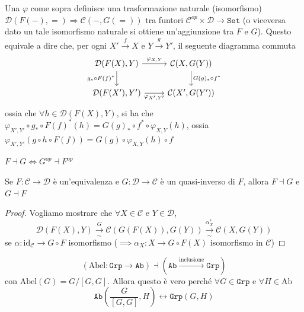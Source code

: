 \begin{remark}{}
    Una \(\varphi \) come sopra definisce una trasformazione naturale
    (isomorfismo) \(\mathcal{D}{(F{(-)}, =)} \Rightarrow \mathcal{C}{(-, G{(=)})}\) tra
    funtori \(\mathcal{C}^{op} \times \mathcal{D} \to \mathtt{Set}\) (o
    viceversa dato un tale isomorfismo naturale si ottiene un'aggiunzione tra
    \(F\) e \(G\)). Questo equivale a dire che, per ogni \( X' \overset{f}{\to }
    X\) e \(Y \overset{g}{\to } Y'\),  il seguente diagramma commuta
    \[\begin{tikzcd}
	\mathcal{D}{(F{(X)}, Y)} & \mathcal{C}{(X, G{(Y)})} \\
	\mathcal{D}{(F{(X')}, Y')} & \mathcal{C}{(X', G{(Y')})}
	\arrow["{\varphi_{X,Y}}", from=1-1, to=1-2]
	\arrow["{g_* \circ F(f)^*}"', from=1-1, to=2-1]
	\arrow["{G(g)_*\circ f^*}", from=1-2, to=2-2]
	\arrow["{\varphi_{X', Y'}}"', from=2-1, to=2-2]
\end{tikzcd}\]
    ossia che \(\forall h \in \mathcal{D}{(F{(X)}, Y)}\), si ha che
    \(\varphi_{X', Y'} \circ g_* \circ F{(f)}^{*} {(h)} = G{(g)}_* \circ f^{*}
    \circ \varphi_{X, Y} {(h)}\), ossia \(\varphi_{X',Y'} {(g \circ h \circ
    F{(f)})} = G{(g)} \circ \varphi_{X, Y} {(h)} \circ f\) 
\end{remark}

\begin{remark}{}
    \(F \dashv G \iff G^{op} \dashv F^{op}\) 
\end{remark}

\begin{example}{}
    Se \(F : \mathcal{C} \to \mathcal{D}\) è un'equivalenza e \(G : \mathcal{D}
    \to \mathcal{C}\) è un quasi-inverso di \(F\), allora \(F \dashv G \) e \(G
    \dashv F\) 
    \begin{proof}{}
        Vogliamo mostrare che \(\forall X \in \mathcal{C}\) e \(Y \in
        \mathcal{D}\), \[\mathcal{D}{(F{(X)}, Y)}
            \underset{\sim}{\overset{G}{\to}} \mathcal{C}{(G{(F{(X)})},
    G{(Y)})}\underset{\sim}{\overset{\alpha_X^{*}}{\to}} \mathcal{C}{(X, G{(Y)})}
\] 
    se \(\alpha: \mathrm{id}_\mathcal{C} \to G \circ F\) isomorfismo (\(\implies
    \alpha_X :X \to G \circ F{(X)}\) isomorfismo in \(\mathcal{C}\))
    \end{proof}
\end{example}

\begin{example}{}
    \[
        (\mathrm{Abel} : \mathtt{Grp} \to \mathtt{Ab}) \dashv {(\mathtt{Ab}
        \overset{\text{inclusione}}{\to } \mathtt{Grp})}
    \]
    con \(\mathrm{Abel}{(G)} = G / [G, G]\). Allora questo è vero perché
    \(\forall G \in \mathtt{Grp}\) e \(\forall H \in \mathrm{Ab}\) 
    \[
        \mathtt{Ab}{\left( \frac{G}{[G,G]}, H \right)} \longleftrightarrow
        \mathtt{Grp}{(G, H)}
    \]
\end{example}

